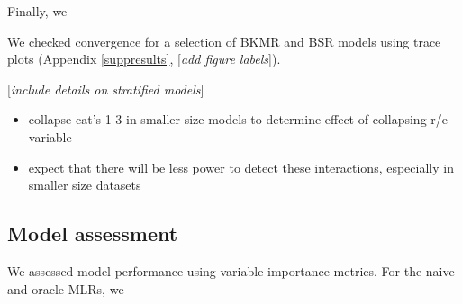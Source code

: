 \documentclass[12pt, twoside]{amherstthesis}
\providecommand{\tightlist}{%
  \setlength{\itemsep}{0pt}\setlength{\parskip}{0pt}}
\begin{document}
Finally, we

We checked convergence for a selection of BKMR and BSR models using trace plots (Appendix \ref{suppresults}, {[}\emph{add figure labels}{]}).

{[}\emph{include details on stratified models}{]}
\begin{itemize}
\tightlist
\item
  collapse cat's 1-3 in smaller size models to determine effect of collapsing r/e variable
\item
  expect that there will be less power to detect these interactions, especially in smaller size datasets
\end{itemize}
\hypertarget{model-assessment}{%
\subsection{Model assessment}\label{model-assessment}}

We assessed model performance using variable importance metrics. For the naive and oracle MLRs, we
\end{document}
